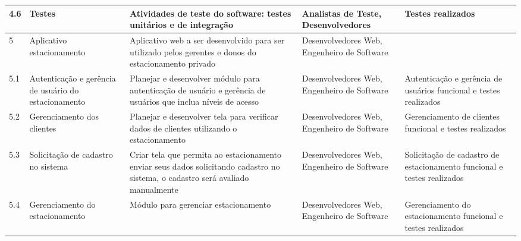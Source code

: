 \begin{landscape}
\begin{longtable}{@{\extracolsep{\fill}}  l  p{}  p{}  p{}  p{}  }
		4.6                    & Testes                                                   & Atividades de teste do software: testes unitários e de integração                                                                                                             & Analistas de Teste, Desenvolvedores                                                              & Testes realizados                                                                                        \\*
		\midrule
		5                      & Aplicativo estacionamento                                & Aplicativo web a ser desenvolvido para ser utilizado pelos gerentes e donos do estacionamento privado                                                                            & Desenvolvedores Web, Engenheiro de Software                                                      &                                                                                                          \\*
		\midrule
		5.1                    & Autenticação e gerência de usuário do estacionamento & Planejar e desenvolver módulo para autenticação de usuário e gerência de usuários que inclua níveis de acesso                                                             & Desenvolvedores Web, Engenheiro de Software                                                      & Autenticação e gerência de usuários funcional e testes realizados                                    \\*
		\midrule
		5.2                    & Gerenciamento dos clientes                               & Planejar e desenvolver tela para verificar dados de clientes utilizando o estacionamento                                                                                         & Desenvolvedores Web, Engenheiro de Software                                                      & Gerenciamento de clientes funcional e testes realizados                                                  \\*
		\midrule
		5.3                    & Solicitação de cadastro no sistema                     & Criar tela que permita ao estacionamento enviar seus dados solicitando cadastro no sistema, o cadastro será avaliado manualmente                                                & Desenvolvedores Web, Engenheiro de Software                                                      & Solicitação de cadastro de estacionamento funcional e testes realizados                                \\*
		\midrule
		5.4                    & Gerenciamento do estacionamento                          & Módulo para gerenciar estacionamento                                                                                                                                            & Desenvolvedores Web, Engenheiro de Software                                                      & Gerenciamento do estacionamento funcional e testes realizados                                            \\*

\end{longtable}
\end{landscape}
